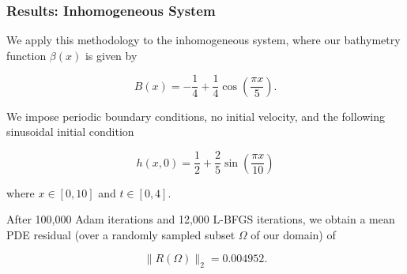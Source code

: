 \begin{frame}
    \frametitle{Results: Inhomogeneous System}

    We apply this methodology to the inhomogeneous system, where our bathymetry function 
    $\beta(x)$ is given by

    $$
    B(x) = -\frac{1}{4} + \frac{1}{4} \cos{\left( \frac{\pi x}{5} \right)}.
    $$
    
    We impose periodic boundary conditions, no initial velocity, and the following sinusoidal initial condition

    $$
    h(x, 0) = \frac{1}{2} + \frac{2}{5} \sin{\left( \frac{\pi x}{10} \right)}
    $$

    where $x \in [0, 10]$ and $t \in [0, 4]$.

    \medskip
    \pause

    After 100,000 Adam iterations and 12,000 L-BFGS iterations, we obtain a mean PDE residual (over a randomly sampled 
    subset $\Omega$ of our domain) of 
    
    $$
    \lVert R(\Omega) \rVert_2 = 0.004952.
    $$
\end{frame}